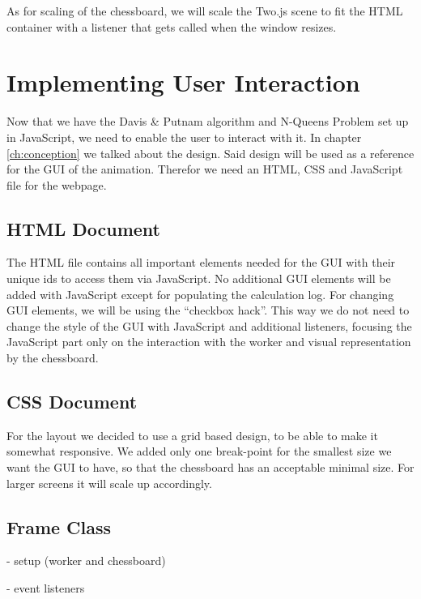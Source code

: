 As for scaling of the chessboard, we will scale the Two.js scene to fit the HTML container with a listener that gets called when the window resizes.

\section{Implementing User Interaction}
\label{sec:impUI}
Now that we have the Davis \& Putnam algorithm and N-Queens Problem set up in JavaScript, we need to enable the user to interact with it. In chapter \ref{ch:conception} we talked about the design. Said design will be used as a reference for the GUI of the animation. Therefor we need an HTML, CSS and JavaScript file for the webpage.

\subsection{HTML Document}
\label{sub:impHTML}
The HTML file contains all important elements needed for the GUI with their unique ids to access them via JavaScript. No additional GUI elements will be added with JavaScript except for populating the calculation log. For changing GUI elements, we will be using the ``checkbox hack''. This way we do not need to change the style of the GUI with JavaScript and additional listeners, focusing the JavaScript part only on the interaction with the worker and visual representation by the chessboard.

\subsection{CSS Document}
\label{sub:impCSS}
For the layout we decided to use a grid based design, to be able to make it somewhat responsive. We added only one break-point for the smallest size we want the GUI to have, so that the chessboard has an acceptable minimal size. For larger screens it will scale up accordingly.

\subsection{Frame Class}
\label{sub:impFrame}

- setup (worker and chessboard)

- event listeners